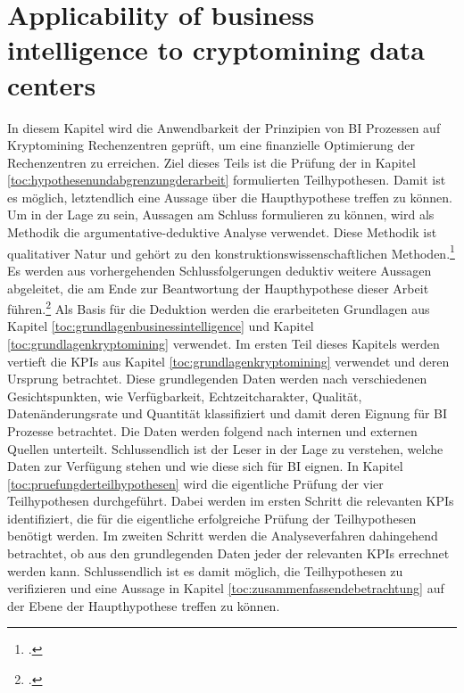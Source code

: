 \newpage
\section{Applicability of business intelligence to cryptomining data centers} \label{toc:ansatzmoeglichkeitenfuerbusinessintelligence}

In diesem Kapitel wird die Anwendbarkeit der Prinzipien von \ac{BI} Prozessen auf Kryptomining Rechenzentren geprüft, um eine
finanzielle Optimierung der Rechenzentren zu erreichen. Ziel dieses Teils ist die Prüfung der in Kapitel
\ref{toc:hypothesenundabgrenzungderarbeit} formulierten Teilhypothesen. Damit ist es möglich, letztendlich eine Aussage über
die Haupthypothese treffen zu können. Um in der Lage zu sein, Aussagen am Schluss formulieren zu können, wird als Methodik die
argumentative-deduktive Analyse verwendet. Diese Methodik ist qualitativer Natur und gehört zu den konstruktionswissenschaftlichen
Methoden.\footcite[Cf.][pp. 283]{wilde2007forschungsmethoden} Es werden aus vorhergehenden Schlussfolgerungen deduktiv weitere
Aussagen abgeleitet, die am Ende zur Beantwortung der Haupthypothese dieser Arbeit
führen.\footcite[Cf.][p. 7]{wilde2006methodenspektrum} Als Basis für die Deduktion werden die erarbeiteten Grundlagen aus
Kapitel \ref{toc:grundlagenbusinessintelligence} und Kapitel \ref{toc:grundlagenkryptomining} verwendet. Im ersten Teil
dieses Kapitels werden  vertieft die \acp{KPI} aus Kapitel \ref{toc:grundlagenkryptomining} verwendet und deren Ursprung
betrachtet. Diese grundlegenden Daten werden nach verschiedenen Gesichtspunkten, wie Verfügbarkeit, Echtzeitcharakter,
Qualität, Datenänderungsrate und Quantität klassifiziert und damit deren Eignung für \ac{BI} Prozesse betrachtet. Die Daten
werden folgend nach internen und externen Quellen unterteilt. Schlussendlich ist der Leser in der Lage zu verstehen, welche
Daten zur Verfügung stehen und wie diese sich für \ac{BI} eignen. In Kapitel \ref{toc:pruefungderteilhypothesen} wird
die eigentliche Prüfung der vier Teilhypothesen durchgeführt. Dabei werden im ersten Schritt die relevanten \acp{KPI}
identifiziert, die für die eigentliche erfolgreiche Prüfung der Teilhypothesen benötigt werden. Im zweiten Schritt werden
die Analyseverfahren dahingehend betrachtet, ob aus den grundlegenden Daten jeder der relevanten \acp{KPI} errechnet werden kann.
Schlussendlich ist es damit möglich, die Teilhypothesen zu verifizieren und eine Aussage in Kapitel 
\ref{toc:zusammenfassendebetrachtung} auf der Ebene der Haupthypothese treffen zu können.

